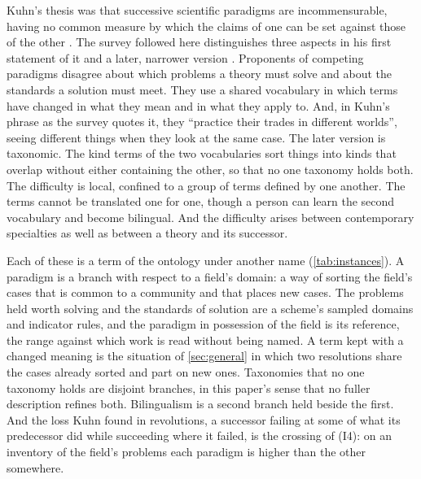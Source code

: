 Kuhn's thesis was that successive scientific paradigms are incommensurable, having no common measure by which the claims of one can be set against those of the other \cite{Kuhn1962}. The survey followed here distinguishes three aspects in his first statement of it and a later, narrower version \cite{OberheimHoyningenHuene2024}. Proponents of competing paradigms disagree about which problems a theory must solve and about the standards a solution must meet. They use a shared vocabulary in which terms have changed in what they mean and in what they apply to. And, in Kuhn's phrase as the survey quotes it, they ``practice their trades in different worlds'', seeing different things when they look at the same case. The later version is taxonomic. The kind terms of the two vocabularies sort things into kinds that overlap without either containing the other, so that no one taxonomy holds both. The difficulty is local, confined to a group of terms defined by one another. The terms cannot be translated one for one, though a person can learn the second vocabulary and become bilingual. And the difficulty arises between contemporary specialties as well as between a theory and its successor.

Each of these is a term of the ontology under another name (\autoref{tab:instances}). A paradigm is a branch with respect to a field's domain: a way of sorting the field's cases that is common to a community and that places new cases. The problems held worth solving and the standards of solution are a scheme's sampled domains and indicator rules, and the paradigm in possession of the field is its reference, the range against which work is read without being named. A term kept with a changed meaning is the situation of \autoref{sec:general} in which two resolutions share the cases already sorted and part on new ones. Taxonomies that no one taxonomy holds are disjoint branches, in this paper's sense that no fuller description refines both. Bilingualism is a second branch held beside the first. And the loss Kuhn found in revolutions, a successor failing at some of what its predecessor did while succeeding where it failed, is the crossing of (I4): on an inventory of the field's problems each paradigm is higher than the other somewhere.

